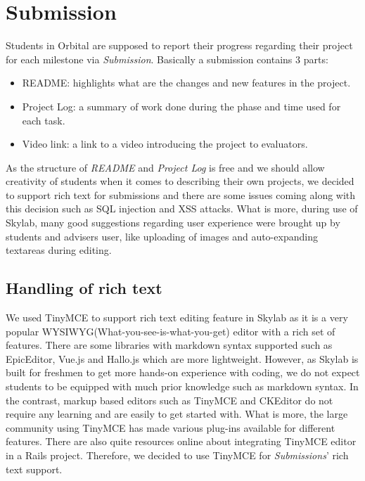 \chapter{Submission} \label{submission}

Students in Orbital are supposed to report their progress regarding their project for each milestone via \textit{Submission}. Basically a submission contains 3 parts:

\begin{itemize}
  \item README: highlights what are the changes and new features in the project.
  \item Project Log: a summary of work done during the phase and time used for each task.
  \item Video link: a link to a video introducing the project to evaluators.
\end{itemize}

As the structure of \textit{README} and \textit{Project Log} is free and we should allow creativity of students when it comes to describing their own projects, we decided to support rich text for submissions and there are some issues coming along with this decision such as SQL injection and XSS attacks. What is more, during use of Skylab, many good suggestions regarding user experience were brought up by students and advisers user, like uploading of images and auto-expanding textareas during editing.

\section{Handling of rich text}
We used TinyMCE to support rich text editing feature in Skylab as it is a very popular WYSIWYG(What-you-see-is-what-you-get) editor with a rich set of features\cite{citation10}. There are some libraries with markdown syntax supported such as EpicEditor, Vue.js and Hallo.js which are more lightweight. However, as Skylab is built for freshmen to get more hands-on experience with coding, we do not expect students to be equipped with much prior knowledge such as markdown syntax. In the contrast, markup based editors such as TinyMCE and CKEditor do not require any learning and are easily to get started with. What is more, the large community using TinyMCE has made various plug-ins available for different features. There are also quite resources online about integrating TinyMCE editor in a Rails project. Therefore, we decided to use TinyMCE for \textit{Submissions}' rich text support.

